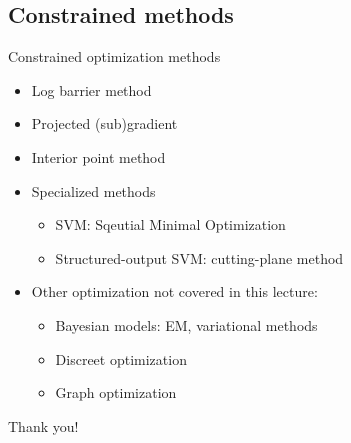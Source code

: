 \documentclass[notes]{beamer}
\newcommand{\chuhao}{\fontsize{44.9pt}{\baselineskip}\selectfont}
\begin{document}
\subsection{Constrained methods} 
\begin{frame}{Constrained optimization methods}
	\begin{itemize}
		\item Log barrier method 
		\item Projected (sub)gradient 
		\item Interior point method 
		\item Specialized methods 
		\begin{itemize}
			\item SVM: Sqeutial Minimal Optimization 
			\item Structured-output SVM: cutting-plane method 
		\end{itemize}
		\item Other optimization not covered in this lecture: 
		\begin{itemize}
			\item Bayesian models: EM, variational methods 
			\item Discreet optimization 
			\item Graph optimization 
		\end{itemize}
	\end{itemize}
\end{frame}

%
%

\begin{frame}
\chuhao Thank you! %
\end{frame}
		
	
\end{document}
